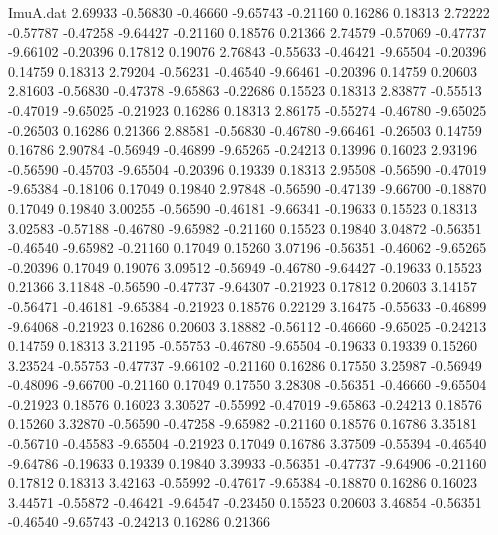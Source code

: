 \begin{filecontents}{ImuA.dat}
   2.69933   -0.56830   -0.46660   -9.65743   -0.21160    0.16286    0.18313
   2.72222   -0.57787   -0.47258   -9.64427   -0.21160    0.18576    0.21366
   2.74579   -0.57069   -0.47737   -9.66102   -0.20396    0.17812    0.19076
   2.76843   -0.55633   -0.46421   -9.65504   -0.20396    0.14759    0.18313
   2.79204   -0.56231   -0.46540   -9.66461   -0.20396    0.14759    0.20603
   2.81603   -0.56830   -0.47378   -9.65863   -0.22686    0.15523    0.18313
   2.83877   -0.55513   -0.47019   -9.65025   -0.21923    0.16286    0.18313
   2.86175   -0.55274   -0.46780   -9.65025   -0.26503    0.16286    0.21366
   2.88581   -0.56830   -0.46780   -9.66461   -0.26503    0.14759    0.16786
   2.90784   -0.56949   -0.46899   -9.65265   -0.24213    0.13996    0.16023
   2.93196   -0.56590   -0.45703   -9.65504   -0.20396    0.19339    0.18313
   2.95508   -0.56590   -0.47019   -9.65384   -0.18106    0.17049    0.19840
   2.97848   -0.56590   -0.47139   -9.66700   -0.18870    0.17049    0.19840
   3.00255   -0.56590   -0.46181   -9.66341   -0.19633    0.15523    0.18313
   3.02583   -0.57188   -0.46780   -9.65982   -0.21160    0.15523    0.19840
   3.04872   -0.56351   -0.46540   -9.65982   -0.21160    0.17049    0.15260
   3.07196   -0.56351   -0.46062   -9.65265   -0.20396    0.17049    0.19076
   3.09512   -0.56949   -0.46780   -9.64427   -0.19633    0.15523    0.21366
   3.11848   -0.56590   -0.47737   -9.64307   -0.21923    0.17812    0.20603
   3.14157   -0.56471   -0.46181   -9.65384   -0.21923    0.18576    0.22129
   3.16475   -0.55633   -0.46899   -9.64068   -0.21923    0.16286    0.20603
   3.18882   -0.56112   -0.46660   -9.65025   -0.24213    0.14759    0.18313
   3.21195   -0.55753   -0.46780   -9.65504   -0.19633    0.19339    0.15260
   3.23524   -0.55753   -0.47737   -9.66102   -0.21160    0.16286    0.17550
   3.25987   -0.56949   -0.48096   -9.66700   -0.21160    0.17049    0.17550
   3.28308   -0.56351   -0.46660   -9.65504   -0.21923    0.18576    0.16023
   3.30527   -0.55992   -0.47019   -9.65863   -0.24213    0.18576    0.15260
   3.32870   -0.56590   -0.47258   -9.65982   -0.21160    0.18576    0.16786
   3.35181   -0.56710   -0.45583   -9.65504   -0.21923    0.17049    0.16786
   3.37509   -0.55394   -0.46540   -9.64786   -0.19633    0.19339    0.19840
   3.39933   -0.56351   -0.47737   -9.64906   -0.21160    0.17812    0.18313
   3.42163   -0.55992   -0.47617   -9.65384   -0.18870    0.16286    0.16023
   3.44571   -0.55872   -0.46421   -9.64547   -0.23450    0.15523    0.20603
   3.46854   -0.56351   -0.46540   -9.65743   -0.24213    0.16286    0.21366

\end{filecontents}

